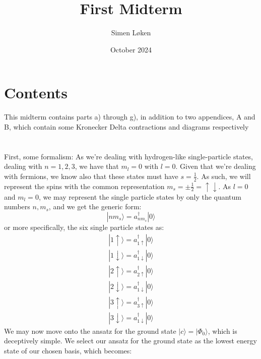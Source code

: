 \documentclass{article}
\title{First Midterm}
\author{Simen Løken}
\date{October 2024}
\begin{document}
\maketitle
\renewcommand{\thesection}{Part \alph{section}}
\renewcommand{\thesubsection}{\alph{subsection})}

\section*{Contents}
This midterm contains parts a) through g), in addition to two appendices, A and B, which contain some Kronecker Delta contractions and diagrams respectively
\section{}
First, some formalism:
\newline
As we're dealing with hydrogen-like single-particle states, dealing with $n = 1, 2, 3$, we have that $m_l = 0$ with $l = 0$. Given that we're dealing with fermions, we know also that these states must have $s = \frac{1}{2}$. As such, we will represent the spins with the common representation $m_s = \pm \frac{1}{2} = \uparrow \downarrow$. \newline
As $l = 0$ and $m_l = 0$, we may represent the single particle states by only the quantum numbers $n, m_s$, and we get the generic form:
\begin{equation}
    | n m_s \rangle = a^\dagger _{n m_s} | 0 \rangle
\end{equation}
or more specifically, the six single particle states as:
\begin{gather*}
    | 1 \uparrow \rangle = a^\dagger_{1 \uparrow} |0 \rangle \\ 
    | 1 \downarrow \rangle = a^\dagger_{1 \downarrow} |0 \rangle \\
    | 2 \uparrow \rangle = a^\dagger_{2 \uparrow} |0 \rangle \\
    | 2 \downarrow \rangle = a^\dagger_{1 \downarrow} |0 \rangle \\
    | 3 \uparrow \rangle = a^\dagger_{3 \uparrow} |0 \rangle \\
    | 3 \downarrow \rangle = a^\dagger_{1 \downarrow} |0 \rangle
\end{gather*}
We may now move onto the ansatz for the ground state $|c\rangle = | \Phi_0 \rangle$, which is deceptively simple. \newline We select our ansatz for the ground state as the lowest energy state of our chosen basis, which becomes:
\end{document}
